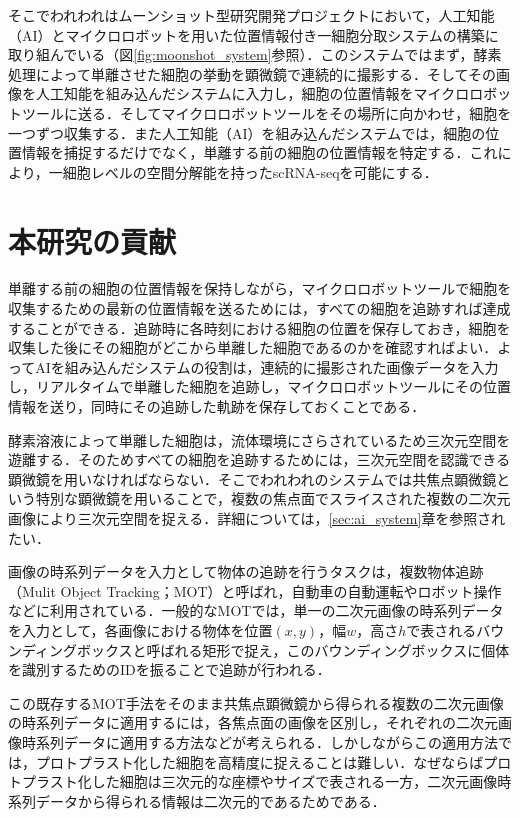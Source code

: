 そこでわれわれはムーンショット型研究開発プロジェクトにおいて，人工知能（AI）とマイクロロボットを用いた位置情報付き一細胞分取システムの構築に取り組んでいる（図\ref{fig:moonshot_system}参照）．このシステムではまず，酵素処理によって単離させた細胞の挙動を顕微鏡で連続的に撮影する．そしてその画像を人工知能を組み込んだシステムに入力し，細胞の位置情報をマイクロロボットツールに送る．そしてマイクロロボットツールをその場所に向かわせ，細胞を一つずつ収集する．また人工知能（AI）を組み込んだシステムでは，細胞の位置情報を捕捉するだけでなく，単離する前の細胞の位置情報を特定する．これにより，一細胞レベルの空間分解能を持ったscRNA-seqを可能にする．

\section{本研究の貢献}
\label{sec:contribution}

単離する前の細胞の位置情報を保持しながら，マイクロロボットツールで細胞を収集するための最新の位置情報を送るためには，すべての細胞を追跡すれば達成することができる．追跡時に各時刻における細胞の位置を保存しておき，細胞を収集した後にその細胞がどこから単離した細胞であるのかを確認すればよい．よってAIを組み込んだシステムの役割は，連続的に撮影された画像データを入力し，リアルタイムで単離した細胞を追跡し，マイクロロボットツールにその位置情報を送り，同時にその追跡した軌跡を保存しておくことである．

酵素溶液によって単離した細胞は，流体環境にさらされているため三次元空間を遊離する．そのためすべての細胞を追跡するためには，三次元空間を認識できる顕微鏡を用いなければならない．そこでわれわれのシステムでは共焦点顕微鏡という特別な顕微鏡を用いることで，複数の焦点面でスライスされた複数の二次元画像により三次元空間を捉える．詳細については，\ref{sec:ai_system}章を参照されたい．

画像の時系列データを入力として物体の追跡を行うタスクは，複数物体追跡（Mulit Object Tracking；MOT）と呼ばれ，自動車の自動運転やロボット操作などに利用されている．一般的なMOTでは，単一の二次元画像の時系列データを入力として，各画像における物体を位置$(x, y)$，幅$w$，高さ$h$で表されるバウンディングボックスと呼ばれる矩形で捉え，このバウンディングボックスに個体を識別するためのIDを振ることで追跡が行われる．

この既存するMOT手法をそのまま共焦点顕微鏡から得られる複数の二次元画像の時系列データに適用するには，各焦点面の画像を区別し，それぞれの二次元画像時系列データに適用する方法などが考えられる．しかしながらこの適用方法では，プロトプラスト化した細胞を高精度に捉えることは難しい．なぜならばプロトプラスト化した細胞は三次元的な座標やサイズで表される一方，二次元画像時系列データから得られる情報は二次元的であるためである．

